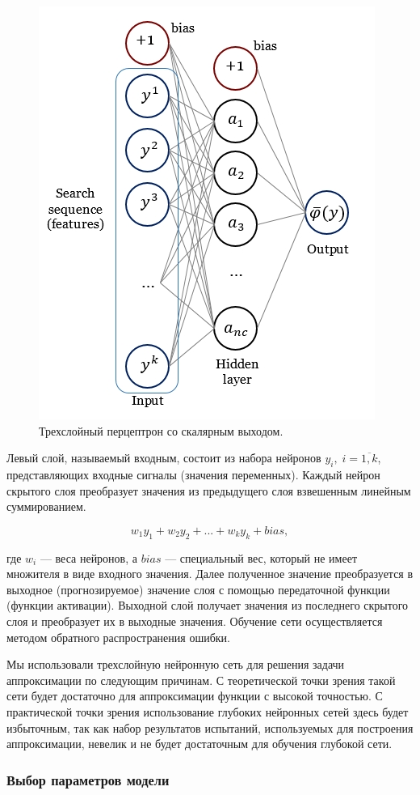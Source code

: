 \documentclass[mathematics,article,accept,pdftex,moreauthors]{Definitions/mdpi}
\begin{document}
\begin{figure}[H]
 
\includegraphics[width=5 cm]{perceptron.jpg}
\caption{Трехслойный перцептрон со скалярным выходом.\label{fig1}}
 
\end{figure}

Левый слой, называемый входным, состоит из набора нейронов $y_i, \; i=\overline{1,k}$, представляющих входные сигналы (значения переменных). Каждый нейрон скрытого слоя преобразует значения из предыдущего слоя взвешенным линейным суммированием.
\begin{linenomath}
\begin{equation}
w_1 y_1 + w_2 y_2+...+w_k y_k+bias,
\end{equation}
\end{linenomath}
где $w_i$ — веса нейронов, а $bias$ — специальный вес, который не имеет множителя в виде входного значения. Далее полученное значение преобразуется в выходное (прогнозируемое) значение слоя с помощью передаточной функции (функции активации). Выходной слой получает значения из последнего скрытого слоя и преобразует их в выходные значения. Обучение сети осуществляется методом обратного распространения ошибки.

Мы использовали трехслойную нейронную сеть для решения задачи аппроксимации по следующим причинам. С теоретической точки зрения такой сети будет достаточно для аппроксимации функции с высокой точностью. С практической точки зрения использование глубоких нейронных сетей здесь будет избыточным, так как набор результатов испытаний, используемых для построения аппроксимации, невелик и не будет достаточным для обучения глубокой сети.

\subsubsection{Выбор параметров модели}
\end{document}
